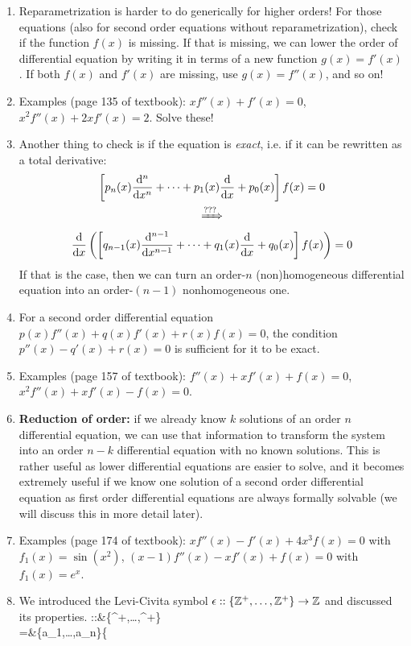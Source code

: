 {\begin{enumerate}
		\item Reparametrization is harder to do generically for higher orders! For those equations (also for second order equations without reparametrization), check if the function $f(x)$ is missing. If that is missing, we can lower the order of differential equation by writing it in terms of a new function $g(x)=f'(x)$. If both $f(x)$ and $f'(x)$ are missing, use $g(x)=f''(x)$, and so on!
		\item Examples (page 135 of textbook): $xf''(x)+f'(x)=0$, $x^2f''(x)+2xf'(x)=2$. Solve these!
		\item Another thing to check is if the equation is \emph{exact}, i.e. if it can be rewritten as a total derivative:
		\begin{multline*}
			\left[p_n(x)\frac{\dd ^n}{\dd x^n}+\dots+p_1(x)\frac{\dd }{\dd x}+p_0(x)\right]f(x)=0\\
			\xRightarrow{???}\\
			\frac{\dd }{\dd x}\left(\left[q_{n-1}(x)\frac{\dd ^{n-1}}{\dd x^{n-1}}+\dots+q_1(x)\frac{\dd }{\dd x}+q_0(x)\right]f(x)\right)=0
		\end{multline*}
		If that is the case, then we can turn an order-$n$ (non)homogeneous differential equation into an order-$(n-1)$ nonhomogeneous one.
		\item For a second order differential equation $p(x)f''(x)+q(x)f'(x)+r(x)f(x)=0$, the condition $p''(x)-q'(x)+r(x)=0$ is sufficient for it to be exact.
		\item Examples (page 157 of textbook): $f''(x)+xf'(x)+f(x)=0$, $x^2f''(x)+xf'(x)-f(x)=0$.
		\item \textbf{Reduction of order:} if we already know $k$ solutions of an order $n$ differential equation, we can use that information to transform the system into an order $n-k$ differential equation with no known solutions. This is rather useful as lower differential equations are easier to solve, and it becomes extremely useful if we know one solution of a second order differential equation as first order differential equations are always formally solvable (we will discuss this in more detail later).
		\item Examples (page 174 of textbook): $xf''(x)-f'(x)+4x^3f(x)=0$ with $f_1(x)=\sin(x^2)$, $(x-1)f''(x)-xf'(x)+f(x)=0$ with $f_1(x)=e^x$.
		\item We introduced the Levi-Civita symbol $\epsilon::\{\mathbb{Z}^+,\dots,\mathbb{Z}^+\}\to\mathbb{Z}$ and discussed its properties.
		\bea 
		\e::{}&{}\{\Z^+,\dots,\Z^+\}\to\Z\\
		\e={}&{}\{a_1,\dots,a_n\}\to\left\{\begin{aligned}

\end{aligned}
\end{enumerate}}
